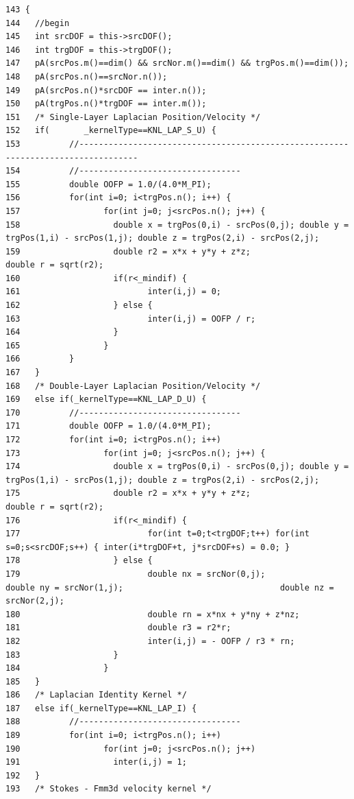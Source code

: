 \footnotesize\begin{verbatim}143 {
144   //begin
145   int srcDOF = this->srcDOF();
146   int trgDOF = this->trgDOF();
147   pA(srcPos.m()==dim() && srcNor.m()==dim() && trgPos.m()==dim());
148   pA(srcPos.n()==srcNor.n());
149   pA(srcPos.n()*srcDOF == inter.n());
150   pA(trgPos.n()*trgDOF == inter.m());
151   /* Single-Layer Laplacian Position/Velocity */
152   if(       _kernelType==KNL_LAP_S_U) {
153          //----------------------------------------------------------------------------------
154          //---------------------------------
155          double OOFP = 1.0/(4.0*M_PI);
156          for(int i=0; i<trgPos.n(); i++) {
157                 for(int j=0; j<srcPos.n(); j++) {
158                   double x = trgPos(0,i) - srcPos(0,j); double y = trgPos(1,i) - srcPos(1,j); double z = trgPos(2,i) - srcPos(2,j);
159                   double r2 = x*x + y*y + z*z;                                                    double r = sqrt(r2);
160                   if(r<_mindif) {
161                          inter(i,j) = 0;
162                   } else {
163                          inter(i,j) = OOFP / r;
164                   }
165                 }
166          }
167   }
168   /* Double-Layer Laplacian Position/Velocity */
169   else if(_kernelType==KNL_LAP_D_U) {
170          //---------------------------------
171          double OOFP = 1.0/(4.0*M_PI);
172          for(int i=0; i<trgPos.n(); i++)
173                 for(int j=0; j<srcPos.n(); j++) {
174                   double x = trgPos(0,i) - srcPos(0,j); double y = trgPos(1,i) - srcPos(1,j); double z = trgPos(2,i) - srcPos(2,j);
175                   double r2 = x*x + y*y + z*z;                    double r = sqrt(r2);
176                   if(r<_mindif) {
177                          for(int t=0;t<trgDOF;t++) for(int s=0;s<srcDOF;s++) { inter(i*trgDOF+t, j*srcDOF+s) = 0.0; }
178                   } else {
179                          double nx = srcNor(0,j);                                 double ny = srcNor(1,j);                                double nz = srcNor(2,j);
180                          double rn = x*nx + y*ny + z*nz;
181                          double r3 = r2*r;
182                          inter(i,j) = - OOFP / r3 * rn;
183                   }
184                 }
185   }
186   /* Laplacian Identity Kernel */
187   else if(_kernelType==KNL_LAP_I) {
188          //---------------------------------
189          for(int i=0; i<trgPos.n(); i++)
190                 for(int j=0; j<srcPos.n(); j++)
191                   inter(i,j) = 1;
192   }
193   /* Stokes - Fmm3d velocity kernel */

\end{verbatim}
